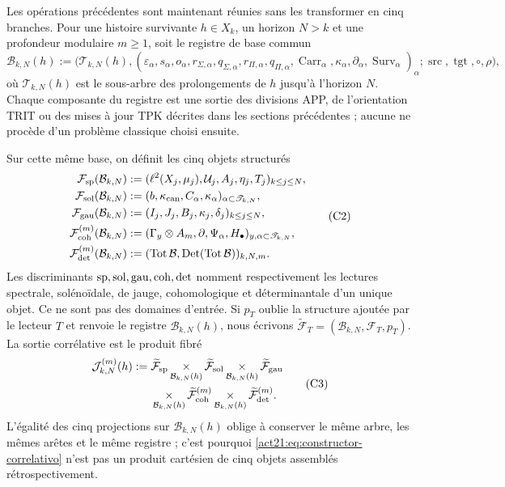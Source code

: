 Les opérations précédentes sont maintenant réunies sans les transformer en cinq branches. Pour une histoire survivante \(h\in X_k\), un horizon \(N>k\) et une profondeur modulaire \(m\geq1\), soit le registre de base commun
\[
 \mathcal B_{k,N}(h):=
 \bigl(\mathscr T_{k,N}(h),
       (\varepsilon_\alpha,s_\alpha,o_\alpha,
        r_{\Sigma,\alpha},q_{\Sigma,\alpha},
        r_{\Pi,\alpha},q_{\Pi,\alpha},
        \operatorname{Carr}_\alpha,
        \kappa_\alpha,\partial_\alpha,
        \operatorname{Surv}_\alpha)_\alpha;
       \operatorname{src},\operatorname{tgt},\circ,\rho\bigr),
 \tag{C1}
 \label{act21:eq:base-comun-registros}
\]
où \(\mathscr T_{k,N}(h)\) est le sous-arbre des prolongements de \(h\)
jusqu'à l'horizon \(N\). Chaque composante du registre est une sortie des
divisions APP, de l'orientation TRIT ou des mises à jour TPK décrites
dans les sections précédentes ; aucune ne procède d'un problème classique choisi
ensuite.

Sur cette même base, on définit les cinq objets structurés
\[
\begin{aligned}
 \mathcal F_{\rm sp}(\mathcal B_{k,N})
   &:=(\ell^2(X_j,\mu_j),\mathcal U_j,A_j,\eta_j,T_j)_{k\leq j\leq N},\\
 \mathcal F_{\rm sol}(\mathcal B_{k,N})
   &:=(b,\kappa_{\rm can},C_\alpha,\kappa_\alpha)_{\alpha\subset\mathscr T_{k,N}},\\
 \mathcal F_{\rm gau}(\mathcal B_{k,N})
   &:=(I_j,J_j,B_j,\kappa_j,\delta_j)_{k\leq j\leq N},\\
 \mathcal F_{\rm coh}^{(m)}(\mathcal B_{k,N})
   &:=(\Gamma_y\otimes A_m,\partial,\Psi_\alpha,H_\bullet)_{y,\alpha\subset\mathscr T_{k,N}},\\
 \mathcal F_{\rm det}^{(m)}(\mathcal B_{k,N})
   &:=(\operatorname{Tot}\mathcal B,\operatorname{Det}(\operatorname{Tot}\mathcal B))_{k,N,m}.
\end{aligned}
 \tag{C2}
\]
Les discriminants \({\rm sp},{\rm sol},{\rm gau},{\rm coh},{\rm det}\) nomment respectivement les lectures spectrale, solénoïdale, de jauge, cohomologique et déterminantale d'un unique objet. Ce ne sont pas des domaines d'entrée. Si \(p_T\) oublie la structure ajoutée par le lecteur \(T\) et renvoie le registre \(\mathcal B_{k,N}(h)\), nous écrivons \(\widetilde{\mathcal F}_T=(\mathcal B_{k,N},\mathcal F_T,p_T)\). La sortie corrélative est le produit fibré
\[
\begin{aligned}
 \mathcal J_{k,N}^{(m)}(h):={}&
 \widetilde{\mathcal F}_{\rm sp}
 \mathop{\times}_{\mathcal B_{k,N}(h)}
 \widetilde{\mathcal F}_{\rm sol}
 \mathop{\times}_{\mathcal B_{k,N}(h)}
 \widetilde{\mathcal F}_{\rm gau}\\
 &\mathop{\times}_{\mathcal B_{k,N}(h)}
 \widetilde{\mathcal F}_{\rm coh}^{(m)}
 \mathop{\times}_{\mathcal B_{k,N}(h)}
 \widetilde{\mathcal F}_{\rm det}^{(m)}.
\end{aligned}
 \tag{C3}
 \label{act21:eq:constructor-correlativo}
\]
L'égalité des cinq projections sur \(\mathcal B_{k,N}(h)\) oblige à
conserver le même arbre, les mêmes arêtes et le même registre ; c'est pourquoi
\eqref{act21:eq:constructor-correlativo} n'est pas un produit cartésien de cinq
objets assemblés rétrospectivement.


